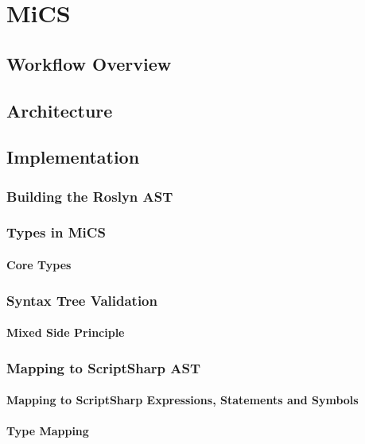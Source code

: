 \chapter{MiCS}

\section{Workflow Overview}

\section{Architecture}

\section{Implementation}

	\subsection{Building the Roslyn AST}

	\subsection{Types in MiCS}

		\subsubsection{Core Types}

	\subsection{Syntax Tree Validation}

		\subsubsection{Mixed Side Principle}

	\subsection{Mapping to ScriptSharp AST}

		\subsubsection{Mapping to ScriptSharp Expressions, Statements and Symbols}

		\subsubsection{Type Mapping}

